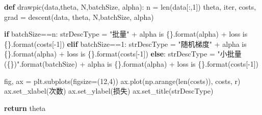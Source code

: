 \documentclass[
]{article}
\newenvironment{Shaded}{}{}
\newcommand{\BuiltInTok}[1]{#1}
\newcommand{\ControlFlowTok}[1]{\textcolor[rgb]{0.00,0.44,0.13}{\textbf{#1}}}
\newcommand{\DecValTok}[1]{\textcolor[rgb]{0.25,0.63,0.44}{#1}}
\newcommand{\KeywordTok}[1]{\textcolor[rgb]{0.00,0.44,0.13}{\textbf{#1}}}
\newcommand{\NormalTok}[1]{#1}
\newcommand{\OperatorTok}[1]{\textcolor[rgb]{0.40,0.40,0.40}{#1}}
\newcommand{\SpecialCharTok}[1]{\textcolor[rgb]{0.25,0.44,0.63}{#1}}
\newcommand{\StringTok}[1]{\textcolor[rgb]{0.25,0.44,0.63}{#1}}
\begin{document}
\begin{Shaded}
\begin{Highlighting}[]
\KeywordTok{def}\NormalTok{ drawpic(data,theta, N,batchSize, alpha):}
\NormalTok{    n }\OperatorTok{=} \BuiltInTok{len}\NormalTok{(data[:,}\DecValTok{1}\NormalTok{])}
\NormalTok{    theta, }\BuiltInTok{iter}\NormalTok{, costs, grad }\OperatorTok{=}\NormalTok{ descent(data, theta, N,batchSize, alpha)}

    \ControlFlowTok{if}\NormalTok{ batchSize}\OperatorTok{==}\NormalTok{n: strDescType }\OperatorTok{=} \StringTok{"批量"} \OperatorTok{+} \StringTok{\textquotesingle{} alpha is }\SpecialCharTok{\{\}}\StringTok{\textquotesingle{}}\NormalTok{.}\BuiltInTok{format}\NormalTok{(alpha) }\OperatorTok{+} \StringTok{\textquotesingle{} loss is }\SpecialCharTok{\{\}}\StringTok{\textquotesingle{}}\NormalTok{.}\BuiltInTok{format}\NormalTok{(costs[}\OperatorTok{{-}}\DecValTok{1}\NormalTok{])}
    \ControlFlowTok{elif}\NormalTok{ batchSize}\OperatorTok{==}\DecValTok{1}\NormalTok{:  strDescType }\OperatorTok{=} \StringTok{"随机梯度"} \OperatorTok{+} \StringTok{\textquotesingle{} alpha is }\SpecialCharTok{\{\}}\StringTok{\textquotesingle{}}\NormalTok{.}\BuiltInTok{format}\NormalTok{(alpha) }\OperatorTok{+} \StringTok{\textquotesingle{} loss is }\SpecialCharTok{\{\}}\StringTok{\textquotesingle{}}\NormalTok{.}\BuiltInTok{format}\NormalTok{(costs[}\OperatorTok{{-}}\DecValTok{1}\NormalTok{])}
    \ControlFlowTok{else}\NormalTok{: strDescType }\OperatorTok{=} \StringTok{"小批量 (}\SpecialCharTok{\{\}}\StringTok{)"}\NormalTok{.}\BuiltInTok{format}\NormalTok{(batchSize) }\OperatorTok{+}  \StringTok{\textquotesingle{} alpha is }\SpecialCharTok{\{\}}\StringTok{\textquotesingle{}}\NormalTok{.}\BuiltInTok{format}\NormalTok{(alpha) }\OperatorTok{+}\StringTok{\textquotesingle{} loss is }\SpecialCharTok{\{\}}\StringTok{\textquotesingle{}}\NormalTok{.}\BuiltInTok{format}\NormalTok{(costs[}\OperatorTok{{-}}\DecValTok{1}\NormalTok{])}

\NormalTok{    fig, ax }\OperatorTok{=}\NormalTok{ plt.subplots(figsize}\OperatorTok{=}\NormalTok{(}\DecValTok{12}\NormalTok{,}\DecValTok{4}\NormalTok{))}
\NormalTok{    ax.plot(np.arange(}\BuiltInTok{len}\NormalTok{(costs)), costs, }\StringTok{\textquotesingle{}r\textquotesingle{}}\NormalTok{)}
\NormalTok{    ax.set\_xlabel(}\StringTok{\textquotesingle{}次数\textquotesingle{}}\NormalTok{)}
\NormalTok{    ax.set\_ylabel(}\StringTok{\textquotesingle{}损失\textquotesingle{}}\NormalTok{)}
\NormalTok{    ax.set\_title(strDescType)}

    \ControlFlowTok{return}\NormalTok{ theta}
\end{Highlighting}
\end{Shaded}
\end{document}
